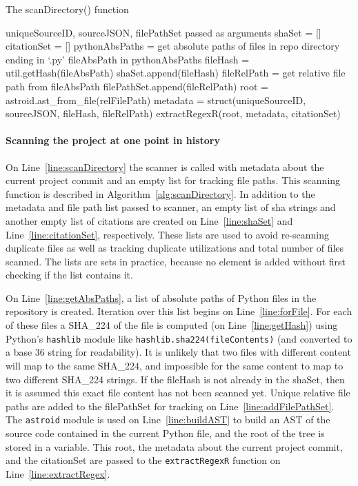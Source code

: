 \begin{algorithm}
  \caption{The scanDirectory() function}\label{alg:scanDirectory}
  \begin{algorithmic}[1]
\State uniqueSourceID, sourceJSON, filePathSet passed as arguments
\State shaSet = []\label{line:shaSet}
\State citationSet = []\label{line:citationSet}
\State pythonAbsPaths = get absolute paths of files in repo directory ending in `.py'\label{line:getAbsPaths}
\For fileAbsPath in pythonAbsPaths\label{line:forFile}
    \State fileHash = util.getHash(fileAbsPath)\label{line:getHash}
        \State shaSet.append(fileHash)
        \State fileRelPath = get relative file path from fileAbsPath
            \State filePathSet.append(fileRelPath)\label{line:addFilePathSet}
        \EndIf
        \State root = astroid.ast\_from\_file(relFilePath)\label{line:buildAST}
        \State metadata = struct(uniqueSourceID, sourceJSON, fileHash, fileRelPath)
        \State extractRegexR(root, metadata, citationSet)\label{line:extractRegex}
    \EndIf
\EndFor
\end{algorithmic}
\end{algorithm}


\paragraph{Scanning the project at one point in history} On Line~\ref{line:scanDirectory} the scanner is called with metadata about the current project commit and an empty list for tracking file paths.  This scanning function is described in Algorithm~\ref{alg:scanDirectory}.  In addition to the metadata and file path list passed to scanner, an empty list of sha strings and another empty list of citations are created on Line~\ref{line:shaSet} and Line~\ref{line:citationSet}, respectively.  These lists are used to avoid re-scanning duplicate files as well as tracking duplicate utilizations and total number of files scanned.  The lists are sets in practice, because no element is added without first checking if the list contains it.

On Line~\ref{line:getAbsPaths}, a list of absolute paths of Python files in the repository is created.  Iteration over this list begins on Line~\ref{line:forFile}.  For each of these files a SHA\_224 of the file is computed (on Line~\ref{line:getHash}) using Python's {\tt hashlib} module like {\tt hashlib.sha224(fileContents)} (and converted to a base 36 string for readability).  It is unlikely that two files with different content will map to the same SHA\_224, and impossible for the same content to map to two different SHA\_224 strings.  If the fileHash is not already in the shaSet, then it is assumed this exact file content has not been scanned yet.  Unique relative file paths are added to the filePathSet for tracking on Line~\ref{line:addFilePathSet}.  The {\tt astroid} module is used on Line~\ref{line:buildAST} to build an AST of the source code contained in the current Python file, and the root of the tree is stored in a variable.  This root, the metadata about the current project commit, and the citationSet are passed to the {\tt extractRegexR} function on Line~\ref{line:extractRegex}.


